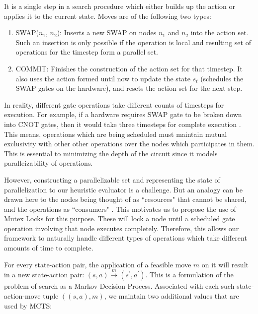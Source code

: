 \begin{defn}[Move]
    It is a single step in a search procedure which either builds up the action or applies it to the current state. Moves are of the following two types:
    \begin{enumerate}
        \item SWAP($n_1$, $n_2$): Inserts a new SWAP on nodes $n_1$ and $n_2$ into the action set. Such an insertion is only possible if the operation is local and resulting set of operations for the timestep form a parallel set.
        \item COMMIT: Finishes the construction of the action set for that timestep. It also uses the action formed until now to update the state $s_t$ (schedules the SWAP gates on the hardware), and resets the action set for the next step.
    \end{enumerate}
\end{defn}

In reality, different gate operations take different counts of timesteps for execution. For example, if a hardware requires SWAP gate to be broken down into CNOT gates, then it would take three timesteps for complete execution \cite{utk_equiv_circuits}. This means, operations which are being scheduled must maintain mutual exclusivity with other other operations over the nodes which participates in them. This is essential to minimizing the depth of the circuit since it models paralleizability of operations.

However, constructing a parallelizable set and representing the state of parallelization to our heuristic evaluator is a challenge. But an analogy can be drawn here to the nodes being thought of as ``resources" that cannot be shared, and the operations as ``consumers" \cite{mutex_dijkstra}. This motivates us to propose the use of Mutex Locks for this purpose. These will lock a node until a scheduled gate operation involving that node executes completely. Therefore, this allows our framework to naturally handle different types of operations which take different amounts of time to complete.


For every state-action pair, the application of a feasible move $m$ on it will result in a new state-action pair: $(s,a) \xrightarrow[]{m} (s^\prime,a^\prime)$. This is a formulation of the problem of search as a Markov Decision Process. Associated with each such state-action-move tuple $((s, a), m)$, we maintain two additional values that are used by MCTS:

